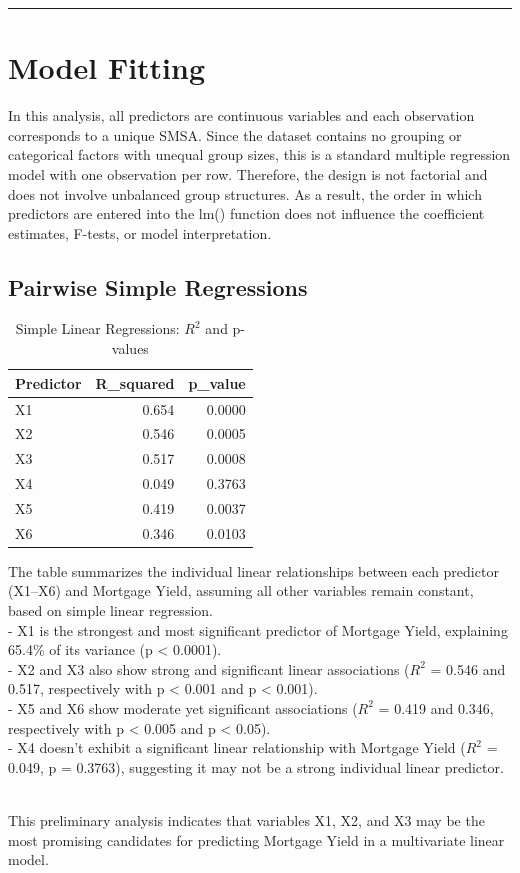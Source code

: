 \documentclass[
  11pt,
]{article}
\begin{document}
\begin{center}\rule{0.5\linewidth}{0.5pt}\end{center}

\section{Model Fitting}\label{model-fitting}

In this analysis, all predictors are continuous variables and each
observation corresponds to a unique SMSA. Since the dataset contains no
grouping or categorical factors with unequal group sizes, this is a
standard multiple regression model with one observation per row.
Therefore, the design is not factorial and does not involve unbalanced
group structures. As a result, the order in which predictors are entered
into the lm() function does not influence the coefficient estimates,
F-tests, or model interpretation.

\subsection{Pairwise Simple
Regressions}\label{pairwise-simple-regressions}

\begingroup\fontsize{8}{10}\selectfont

\begin{longtable}[t]{lrr}
\caption{\label{tab:unnamed-chunk-8}Simple Linear Regressions: $R^2$ and p-values}\\
\toprule
Predictor & R\_squared & p\_value\\
\midrule
X1 & 0.654 & 0.0000\\
X2 & 0.546 & 0.0005\\
X3 & 0.517 & 0.0008\\
X4 & 0.049 & 0.3763\\
X5 & 0.419 & 0.0037\\
\addlinespace
X6 & 0.346 & 0.0103\\
\bottomrule
\end{longtable}
\endgroup{}

The table summarizes the individual linear relationships between each
predictor (X1--X6) and Mortgage Yield, assuming all other variables
remain constant, based on simple linear regression.\\
- X1 is the strongest and most significant predictor of Mortgage Yield,
explaining 65.4\% of its variance (p \textless{} 0.0001).\\
- X2 and X3 also show strong and significant linear associations
(\(R^2\) = 0.546 and 0.517, respectively with p \textless{} 0.001 and p
\textless{} 0.001).\\
- X5 and X6 show moderate yet significant associations (\(R^2\) = 0.419
and 0.346, respectively with p \textless{} 0.005 and p \textless{}
0.05).\\
- X4 doesn't exhibit a significant linear relationship with Mortgage
Yield (\(R^2\) = 0.049, p = 0.3763), suggesting it may not be a strong
individual linear predictor.\\
\strut \\
This preliminary analysis indicates that variables X1, X2, and X3 may be
the most promising candidates for predicting Mortgage Yield in a
multivariate linear model.
\end{document}
